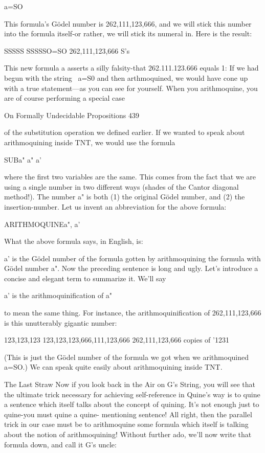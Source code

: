                                           a=SO

This formula's Gödel number is 262,111,123,666, and we will stick this number into the
formula itself-or rather, we will stick its numeral in. Here is the result:

                               SSSSS        SSSSSO=SO
                                  262,111,123,666 S's

This new formula a asserts a silly falsity-that 262.111.123.666 equals 1: If we had begun
with the string ~a=S0 and then arthmoquined, we would have cone up with a true
statement—as you can see for yourself.
       When you arithmoquine, you are of course performing a special case




On Formally Undecidable Propositions                                                    439

of the substitution operation we defined earlier. If we wanted to speak about
arithmoquining inside TNT, we would use the formula

                                      SUB{a" a" a'}

where the first two variables are the same. This comes from the fact that we are using a
single number in two different ways (shades of the Cantor diagonal method!). The
number a" is both (1) the original Gödel number, and (2) the insertion-number. Let us
invent an abbreviation for the above formula:

                               ARITHMOQUINE{a", a'}

What the above formula says, in English, is:

      a' is the Gödel number of the formula gotten by arithmoquining the formula with
      Gödel number a".
Now the preceding sentence is long and ugly. Let's introduce a concise and elegant term
to summarize it. We'll say

       a' is the arithmoquinification of a"

to mean the same thing. For instance, the arithmoquinification of 262,111,123,666 is this
unutterably gigantic number:

                      123,123,123 123,123,123,666,111,123,666
                           262,111,123,666 copies of '1231

(This is just the Gödel number of the formula we got when we arithmoquined a=SO.) We
can speak quite easily about arithmoquining inside TNT.

                                    The Last Straw
Now if you look back in the Air on G's String, you will see that the ultimate trick
necessary for achieving self-reference in Quine's way is to quine a sentence which itself
talks about the concept of quining. It's not enough just to quine-you must quine a quine-
mentioning sentence! All right, then the parallel trick in our case must be to arithmoquine
some formula which itself is talking about the notion of arithmoquining!
        Without further ado, we'll now write that formula down, and call it G's uncle:

